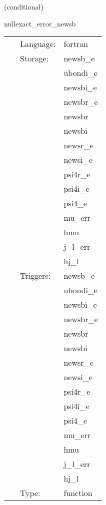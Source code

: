 \vspace{5mm}

   (conditional) 

\hspace{5mm} nullexact\_error\_newsb 

\hspace{5mm}{\it error in characteristic evolution variables } 


\hspace{5mm}

 \begin{tabular*}{160mm}{cll} 
~ & Language:  & fortran \\ 
~ & Storage:  & newsb\_e \\ 
~& ~ &ubondi\_e\\ 
~& ~ &newsbi\_e\\ 
~& ~ &newsbr\_e\\ 
~& ~ &newsbr\\ 
~& ~ &newsbi\\ 
~& ~ &newsr\_e\\ 
~& ~ &newsi\_e\\ 
~& ~ &psi4r\_e\\ 
~& ~ &psi4i\_e\\ 
~& ~ &psi4\_e\\ 
~& ~ &mu\_err\\ 
~& ~ &hmu\\ 
~& ~ &j\_l\_err\\ 
~& ~ &hj\_l\\ 
~ & Triggers:  & newsb\_e \\ 
~& ~ &ubondi\_e\\ 
~& ~ &newsbi\_e\\ 
~& ~ &newsbr\_e\\ 
~& ~ &newsbr\\ 
~& ~ &newsbi\\ 
~& ~ &newsr\_e\\ 
~& ~ &newsi\_e\\ 
~& ~ &psi4r\_e\\ 
~& ~ &psi4i\_e\\ 
~& ~ &psi4\_e\\ 
~& ~ &mu\_err\\ 
~& ~ &hmu\\ 
~& ~ &j\_l\_err\\ 
~& ~ &hj\_l\\ 
~ & Type:  & function \\ 
\end{tabular*} 


\vspace{5mm}

